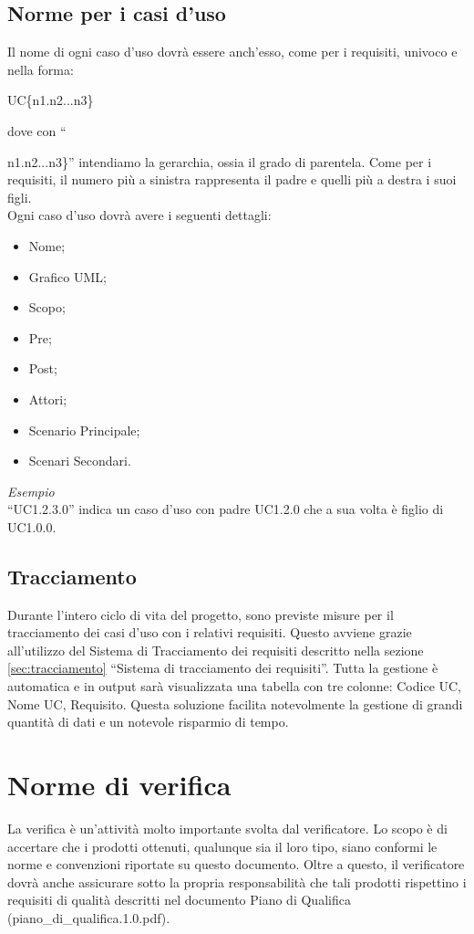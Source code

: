 \subsection{Norme per i casi d'uso}
Il nome di ogni caso d'uso dovrà essere anch'esso, come per i requisiti, univoco e nella forma:
\begin{center}
UC\{n1.n2...n3\}
\end{center}
dove con ``{n1.n2...n3\}'' intendiamo la gerarchia, ossia il grado di parentela. Come per i requisiti, il numero più a sinistra rappresenta il padre e quelli più a destra i suoi figli.\\
Ogni caso d'uso dovrà avere i seguenti dettagli:
\begin{itemize}
\item Nome;
\item Grafico UML;
\item Scopo;
\item Pre;
\item Post;
\item Attori;
\item Scenario Principale;
\item Scenari Secondari.    
\end{itemize}
\textit{Esempio}\\
``UC1.2.3.0'' indica un caso d'uso con padre UC1.2.0 che a sua volta è figlio di UC1.0.0.

\subsection{Tracciamento}
Durante l'intero ciclo di vita del progetto, sono previste misure per il tracciamento dei casi d'uso con i relativi requisiti. Questo avviene grazie all'utilizzo del Sistema di Tracciamento dei requisiti descritto nella sezione \ref{sec:tracciamento} ``Sistema di tracciamento dei requisiti''. Tutta la gestione è automatica e in output sarà visualizzata una tabella con tre colonne: Codice UC, Nome UC, Requisito. Questa soluzione facilita notevolmente la gestione di grandi quantità di dati e un notevole risparmio di tempo.

\newpage
\section{Norme di verifica}
La verifica è un'attività molto importante svolta dal verificatore. Lo scopo è di accertare che i prodotti ottenuti, qualunque sia il loro tipo, siano conformi le norme e convenzioni riportate su questo documento. Oltre a questo, il verificatore dovrà anche assicurare sotto la propria responsabilità che tali prodotti rispettino i requisiti di qualità descritti nel documento Piano di Qualifica (piano\_di\_qualifica.1.0.pdf).

}
